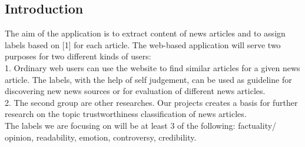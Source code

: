 \documentclass[11pt]{article}
\begin{document}
\begin{multicols}{2}
\section{Introduction}
The aim of the application is to extract content of news articles and to assign labels  based on [1]  for each article. 
The web-based application will serve two purposes for two different kinds of users:\\
1. Ordinary web users can use the website to find similar articles for a  given news article. The labels, with the help of self judgement, can be used as guideline for discovering new news sources or for evaluation of different news articles. \\  
2. The second group are other researches. Our projects creates a basis for further research on the topic trustworthiness classification of news articles.\\
The labels we are focusing on will be at least 3 of the following: factuality/ opinion, readability, emotion, controversy, credibility.


\end{multicols}
\end{document}
